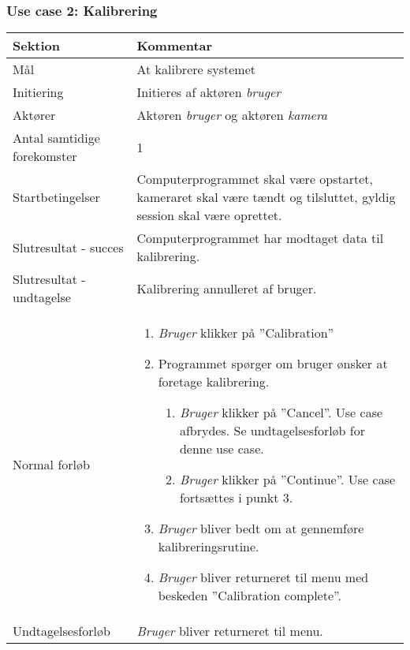 \documentclass[kravspec.tex]{subfiles}
\begin{document}
	\subsubsection{Use case 2: Kalibrering}
	\begin{tabular}{|l|p{7.7cm}|}
		\hline \textbf{Sektion} & \textbf{Kommentar} \\ 
		\hline Mål & At kalibrere systemet \\ 
		\hline Initiering & Initieres af aktøren \textit{bruger} \\ 
		\hline Aktører & Aktøren \textit{bruger} og aktøren \textit{kamera} \\ 
		\hline Antal samtidige forekomster & 1 \\ 
		\hline Startbetingelser & Computerprogrammet skal være opstartet, kameraret skal være tændt og tilsluttet, gyldig session skal være oprettet. \\ 	
		\hline Slutresultat - succes & Computerprogrammet har modtaget data til kalibrering. \\ 
		\hline Slutresultat - undtagelse &  Kalibrering annulleret af bruger. \\ 
		\hline Normal forløb & \begin{enumerate}
			\item \textit{Bruger} klikker på ”Calibration”
			\item Programmet spørger om bruger ønsker at foretage kalibrering.
			\begin{enumerate}
				\item \textit{Bruger} klikker på ”Cancel”.
				Use case afbrydes.
				Se undtagelsesforløb for denne use case.
				\item \textit{Bruger} klikker på ”Continue”. 
				Use case fortsættes i punkt 3.
			\end{enumerate}
			\item \textit{Bruger} bliver bedt om at gennemføre kalibreringsrutine.
			\item \textit{Bruger} bliver returneret til menu med beskeden ”Calibration complete”.

		\end{enumerate} \\ 
		\hline Undtagelsesforløb & \textit{Bruger} bliver returneret til menu.  \\ 
		\hline 
	\end{tabular} \\ \\
	
\end{document}
